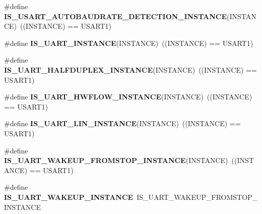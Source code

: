 \begin{DoxyCompactItemize}
\item 
\mbox{\label{group___exported__macro_ga4130cef42f8cada5a91c38b85f76939e}} 
\#define {\bfseries I\+S\+\_\+\+U\+S\+A\+R\+T\+\_\+\+A\+U\+T\+O\+B\+A\+U\+D\+R\+A\+T\+E\+\_\+\+D\+E\+T\+E\+C\+T\+I\+O\+N\+\_\+\+I\+N\+S\+T\+A\+N\+CE}(I\+N\+S\+T\+A\+N\+CE)~((I\+N\+S\+T\+A\+N\+CE) == U\+S\+A\+R\+T1)
\item 
\mbox{\label{group___exported__macro_gacbd2efab4cd39d4867c4dbeacb87e84b}} 
\#define {\bfseries I\+S\+\_\+\+U\+A\+R\+T\+\_\+\+I\+N\+S\+T\+A\+N\+CE}(I\+N\+S\+T\+A\+N\+CE)~((I\+N\+S\+T\+A\+N\+CE) == U\+S\+A\+R\+T1)
\item 
\mbox{\label{group___exported__macro_ga69c4aa0c561c4c39c621710fbbb0cb7b}} 
\#define {\bfseries I\+S\+\_\+\+U\+A\+R\+T\+\_\+\+H\+A\+L\+F\+D\+U\+P\+L\+E\+X\+\_\+\+I\+N\+S\+T\+A\+N\+CE}(I\+N\+S\+T\+A\+N\+CE)~((I\+N\+S\+T\+A\+N\+CE) == U\+S\+A\+R\+T1)
\item 
\mbox{\label{group___exported__macro_gaf9a11d0720f3efa780126414a4ac50ad}} 
\#define {\bfseries I\+S\+\_\+\+U\+A\+R\+T\+\_\+\+H\+W\+F\+L\+O\+W\+\_\+\+I\+N\+S\+T\+A\+N\+CE}(I\+N\+S\+T\+A\+N\+CE)~((I\+N\+S\+T\+A\+N\+CE) == U\+S\+A\+R\+T1)
\item 
\mbox{\label{group___exported__macro_ga7d2763df993c77cfa6e249ec7bc80482}} 
\#define {\bfseries I\+S\+\_\+\+U\+A\+R\+T\+\_\+\+L\+I\+N\+\_\+\+I\+N\+S\+T\+A\+N\+CE}(I\+N\+S\+T\+A\+N\+CE)~((I\+N\+S\+T\+A\+N\+CE) == U\+S\+A\+R\+T1)
\item 
\mbox{\label{group___exported__macro_ga6303097822ab1977cc83f05319a10f1e}} 
\#define {\bfseries I\+S\+\_\+\+U\+A\+R\+T\+\_\+\+W\+A\+K\+E\+U\+P\+\_\+\+F\+R\+O\+M\+S\+T\+O\+P\+\_\+\+I\+N\+S\+T\+A\+N\+CE}(I\+N\+S\+T\+A\+N\+CE)~((I\+N\+S\+T\+A\+N\+CE) == U\+S\+A\+R\+T1)
\item 
\mbox{\label{group___exported__macro_ga69e32d838272d886316fcfa378605ed0}} 
\#define {\bfseries I\+S\+\_\+\+U\+A\+R\+T\+\_\+\+W\+A\+K\+E\+U\+P\+\_\+\+I\+N\+S\+T\+A\+N\+CE}~I\+S\+\_\+\+U\+A\+R\+T\+\_\+\+W\+A\+K\+E\+U\+P\+\_\+\+F\+R\+O\+M\+S\+T\+O\+P\+\_\+\+I\+N\+S\+T\+A\+N\+CE
\item 

\end{DoxyCompactItemize}
